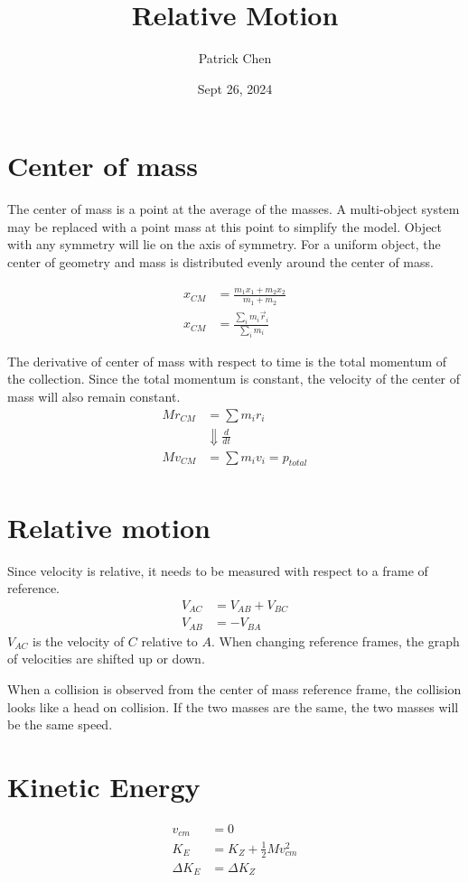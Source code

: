 \documentclass{article}
\title{Relative Motion}
\author{Patrick Chen}
\date{Sept 26, 2024}
\theoremstyle{mytheoremstyle}
\theoremstyle{mytheoremstyle}
\theoremstyle{myproblemstyle}
\begin{document}
    \maketitle
    \section*{Center of mass}
    The center of mass is a point at the average of the masses. A multi-object
    system may be replaced with a point mass at this point to simplify the
    model. Object with any symmetry will lie on the axis of symmetry. For a
    uniform object, the center of geometry and mass is distributed evenly around
    the center of mass.

    \begin{align*}
        x_{CM} &= \frac{m_1x_1+m_2x_2}{m_1+m_2} \\
        x_{CM} &= \frac{\sum_i m_i \vec{r}_i}{\sum_i m_i}
    \end{align*}

    The derivative of center of mass with respect to time is the total momentum
    of the collection. Since the total momentum is constant, the velocity of the
    center of mass will also remain constant.
    \begin{align*}
        Mr_{CM} &= \sum m_ir_i \\
                &\Downarrow \frac{d}{dt} \\
        Mv_{CM} &= \sum m_iv_i = p_{total} \\
    \end{align*}

    \section*{Relative motion}
    Since velocity is relative, it needs to be measured with respect to a frame
    of reference.
    \begin{align*}
        V_{AC} &= V_{AB} + V_{BC} \\
        V_{AB} &= -V_{BA}
    \end{align*}
    $V_{AC}$ is the velocity of $C$ relative to $A$. When changing reference
    frames, the graph of velocities are shifted up or down.

    When a collision is observed from the center of mass reference frame, the
    collision looks like a head on collision. If the two masses are the same,
    the two masses will be the same speed.

    \section*{Kinetic Energy}
    \begin{align*}
        v_{cm}      &= 0 \\
        K_E         &= K_Z + \frac{1}{2} Mv_{cm}^2 \\
        \Delta K_E  &= \Delta K_Z
    \end{align*}
\end{document}
